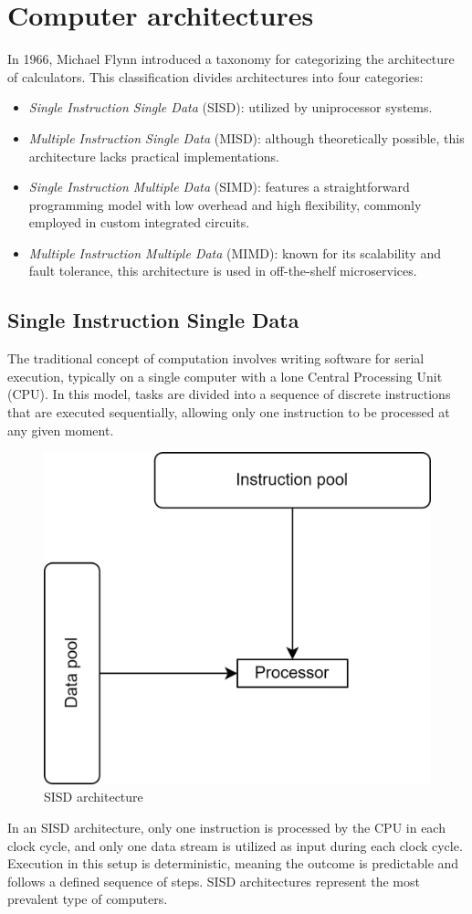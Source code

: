 \section{Computer architectures}

In 1966, Michael Flynn introduced a taxonomy for categorizing the architecture of calculators. 
This classification divides architectures into four categories:
\begin{itemize}
    \item \textit{Single Instruction Single Data} (SISD): utilized by uniprocessor systems.
    \item \textit{Multiple Instruction Single Data} (MISD): although theoretically possible, this architecture lacks practical implementations.
    \item \textit{Single Instruction Multiple Data} (SIMD): features a straightforward programming model with low overhead and high flexibility, commonly employed in custom integrated circuits.
    \item \textit{Multiple Instruction Multiple Data} (MIMD): known for its scalability and fault tolerance, this architecture is used in off-the-shelf microservices.
\end{itemize}

\subsection{Single Instruction Single Data}
The traditional concept of computation involves writing software for serial execution, typically on a single computer with a lone Central Processing Unit (CPU).
In this model, tasks are divided into a sequence of discrete instructions that are executed sequentially, allowing only one instruction to be processed at any given moment.
\begin{figure}[H]
    \centering
    \includegraphics[width=0.3\linewidth]{images/sisd.png}
    \caption{SISD architecture}
\end{figure}
In an SISD architecture, only one instruction is processed by the CPU in each clock cycle, and only one data stream is utilized as input during each clock cycle.
Execution in this setup is deterministic, meaning the outcome is predictable and follows a defined sequence of steps.
SISD architectures represent the most prevalent type of computers.

